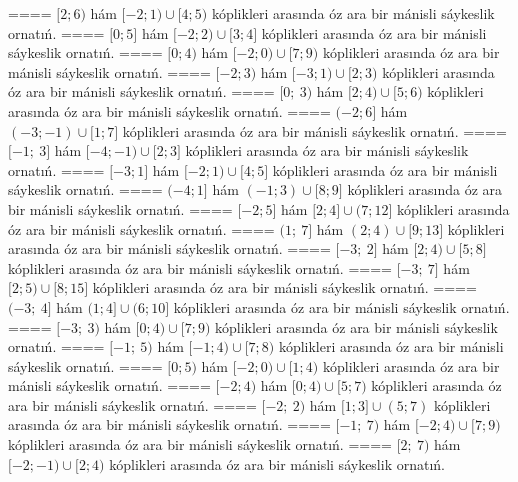 ====
\(\lbrack 2;6)\) hám \(\lbrack - 2;1) \cup \lbrack 4;5)\) kóplikleri arasında óz ara bir mánisli sáykeslik ornatıń.
====
\(\lbrack 0;5\rbrack\) hám \(\lbrack - 2;2) \cup \lbrack 3;4\rbrack\) kóplikleri arasında óz ara bir mánisli sáykeslik ornatıń.
====
\(\lbrack 0;4)\) hám \(\lbrack - 2;0) \cup \lbrack 7;9)\) kóplikleri arasında óz ara bir mánisli sáykeslik ornatıń.
====
\(\lbrack - 2;3)\) hám \(\lbrack - 3;1) \cup \lbrack 2;3)\) kóplikleri arasında óz ara bir mánisli sáykeslik ornatıń.
====
\(\lbrack 0;\ 3)\) hám \(\lbrack 2;4) \cup \lbrack 5;6)\) kóplikleri arasında óz ara bir mánisli sáykeslik ornatıń.
====
\(( - 2;6\rbrack\) hám \(( - 3; - 1) \cup \lbrack 1;7\rbrack\) kóplikleri arasında óz ara bir mánisli sáykeslik ornatıń.
====
\(\lbrack - 1;\ 3\rbrack\) hám \(\lbrack - 4; - 1) \cup \lbrack 2;3\rbrack\) kóplikleri arasında óz ara bir mánisli sáykeslik ornatıń.
====
\(\lbrack - 3;1\rbrack\) hám \(\lbrack - 2;1) \cup \lbrack 4;5\rbrack\) kóplikleri arasında óz ara bir mánisli sáykeslik ornatıń.
====
\(( - 4;1\rbrack\) hám \(( - 1;3) \cup \lbrack 8;9\rbrack\) kóplikleri arasında óz ara bir mánisli sáykeslik ornatıń.
====
\(\lbrack - 2;5\rbrack\) hám \(\lbrack 2;4\rbrack \cup (7;12\rbrack\) kóplikleri arasında óz ara bir mánisli sáykeslik ornatıń.
====
\((1;\ 7\rbrack\) hám \((2;4) \cup \lbrack 9;13\rbrack\) kóplikleri arasında óz ara bir mánisli sáykeslik ornatıń.
====
\(\lbrack - 3;\ 2\rbrack\) hám \(\lbrack 2;4) \cup \lbrack 5;8\rbrack\) kóplikleri arasında óz ara bir mánisli sáykeslik ornatıń.
====
\(\lbrack - 3;\ 7\rbrack\) hám \(\lbrack 2;5) \cup \lbrack 8;15\rbrack\) kóplikleri arasında óz ara bir mánisli sáykeslik ornatıń.
====
\(( - 3;\ 4\rbrack\) hám \((1;4\rbrack \cup (6;10\rbrack\) kóplikleri arasında óz ara bir mánisli sáykeslik ornatıń.
====
\(\lbrack - 3;\ 3)\) hám \(\lbrack 0;4) \cup \lbrack 7;9)\) kóplikleri arasında óz ara bir mánisli sáykeslik ornatıń.
====
\(\lbrack - 1;\ 5)\) hám \(\lbrack - 1;4) \cup \lbrack 7;8)\) kóplikleri arasında óz ara bir mánisli sáykeslik ornatıń.
====
\(\lbrack 0;5)\) hám \(\lbrack - 2;0) \cup \lbrack 1;4)\) kóplikleri arasında óz ara bir mánisli sáykeslik ornatıń.
====
\(\lbrack - 2;4)\) hám \(\lbrack 0;4) \cup \lbrack 5;7)\) kóplikleri arasında óz ara bir mánisli sáykeslik ornatıń.
====
\(\lbrack - 2;\ 2)\) hám \(\lbrack 1;3\rbrack \cup (5;7)\) kóplikleri arasında óz ara bir mánisli sáykeslik ornatıń.
====
\(\lbrack - 1;\ 7)\) hám \(\lbrack - 2;4) \cup \lbrack 7;9)\) kóplikleri arasında óz ara bir mánisli sáykeslik ornatıń.
====
\(\lbrack 2;\ 7)\) hám \(\lbrack - 2; - 1) \cup \lbrack 2;4)\) kóplikleri arasında óz ara bir mánisli sáykeslik ornatıń.
